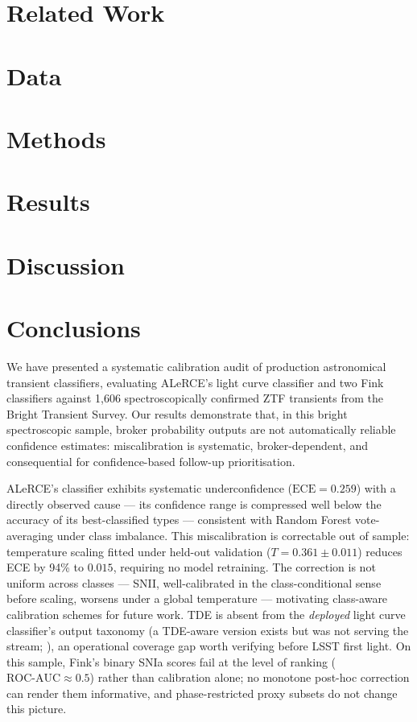 \documentclass[twocolumn]{aastex631}
\begin{document}
\section{Related Work}
\label{sec:related}


\section{Data}
\label{sec:data}


\section{Methods}
\label{sec:methods}


\section{Results}
\label{sec:results}


\section{Discussion}
\label{sec:discussion}


\section{Conclusions}
\label{sec:conclusions}
We have presented a systematic calibration audit of production
astronomical transient classifiers, evaluating ALeRCE's light curve
classifier and two Fink classifiers against 1,606 spectroscopically
confirmed ZTF transients from the Bright Transient Survey. Our results
demonstrate that, in this bright spectroscopic sample, broker
probability outputs are not automatically reliable confidence
estimates: miscalibration is systematic, broker-dependent, and
consequential for confidence-based follow-up prioritisation.

ALeRCE's classifier exhibits systematic underconfidence
($\mathrm{ECE} = 0.259$) with a directly observed cause — its
confidence range is compressed well below the accuracy of its
best-classified types — consistent with Random Forest vote-averaging
under class imbalance. This miscalibration is correctable out of
sample: temperature scaling fitted under held-out validation
($T = 0.361 \pm 0.011$) reduces ECE by 94\% to $0.015$, requiring no
model retraining. The correction is not uniform across classes —
SNII, well-calibrated in the class-conditional sense before scaling,
worsens under a global temperature — motivating class-aware
calibration schemes for future work. TDE is absent from the
\emph{deployed} light curve classifier's output taxonomy (a TDE-aware
version exists but was not serving the stream; \citealt{Pavez-Herrera2025}),
an operational coverage gap worth verifying before LSST first light.
On this sample, Fink's binary SNIa scores fail at the
level of ranking ($\mathrm{ROC\mbox{-}AUC} \approx 0.5$) rather than
calibration alone; no monotone post-hoc correction can render them
informative, and phase-restricted proxy subsets do not change this
picture.
\end{document}
